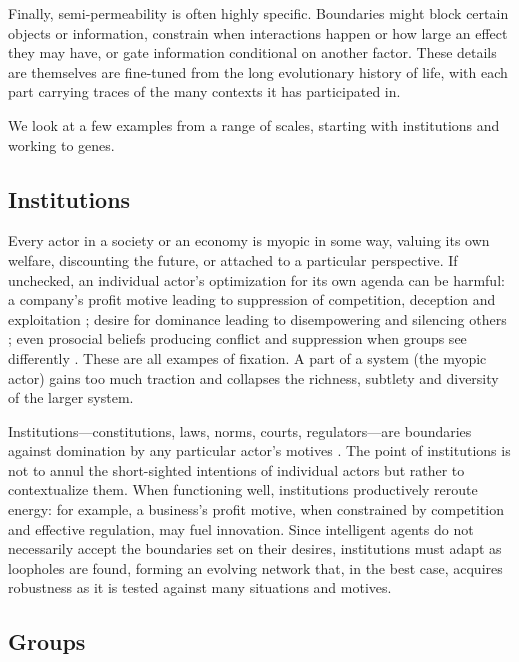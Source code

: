 \documentclass[11pt]{article}
\begin{document}
Finally, semi-permeability is often highly specific. Boundaries might block certain objects or information, constrain when interactions happen or how large an effect they may have, or gate information conditional on another factor. These details are themselves are fine-tuned from the long evolutionary history of life, with each part carrying traces of the many contexts it has participated in. 

We look at a few examples from a range of scales, starting with institutions and working to genes.


\subsection{Institutions} 

Every actor in a society or an economy is myopic in some way, valuing its own welfare, discounting the future, or attached to a particular perspective. If unchecked, an individual actor's optimization for its own agenda can be harmful: a company's profit motive leading to suppression of competition, deception and exploitation \citep{bakan2006corporation}; desire for dominance leading to disempowering and silencing others \citep{sidanius2001social}; even prosocial beliefs producing conflict and suppression when groups see differently \citep{haidt2012righteous}. These are all exampes of fixation. A part of a system (the myopic actor) gains too much traction and collapses the richness, subtlety and diversity of the larger system.

Institutions---constitutions, laws, norms, courts, regulators---are boundaries against domination by any particular actor's motives \citep{north1990institutions, ostrom1990governing, leibo2025societal}. The point of institutions is not to annul the short-sighted intentions of individual actors but rather to contextualize them. When functioning well, institutions productively reroute energy: for example, a business's profit motive, when constrained by competition and effective regulation, may fuel innovation. Since intelligent agents do not necessarily accept the boundaries set on their desires, institutions must adapt as loopholes are found, forming an evolving network that, in the best case, acquires robustness as it is tested against many situations and motives.


\subsection{Groups} 
\end{document}
